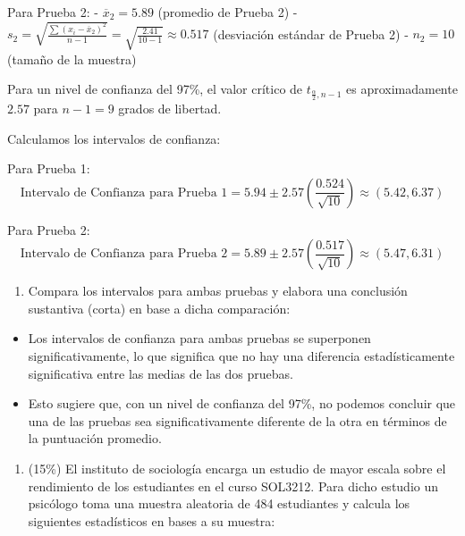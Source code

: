 \documentclass[
  letterpaper,
  DIV=11,
  numbers=noendperiod]{scrartcl}
\providecommand{\tightlist}{%
  \setlength{\itemsep}{0pt}\setlength{\parskip}{0pt}}\usepackage{longtable,booktabs,array}
\begin{document}
Para Prueba 2: - \(\overline{x}_2 = 5.89\) (promedio de Prueba 2) -
\(s_2 = \sqrt{\frac{\sum{(x_i - \overline{x}_2)^2}}{n-1}} = \sqrt{\frac{2.41}{10-1}} \approx 0.517\)
(desviación estándar de Prueba 2) - \(n_2 = 10\) (tamaño de la muestra)

Para un nivel de confianza del 97\%, el valor crítico de
\(t_{\frac{\alpha}{2}, n-1}\) es aproximadamente \(2.57\) para
\(n-1 = 9\) grados de libertad.

Calculamos los intervalos de confianza:

Para Prueba 1:
\[\text{Intervalo de Confianza para Prueba 1} = 5.94 \pm 2.57 \left(\frac{0.524}{\sqrt{10}}\right) \approx (5.42, 6.37)\]

Para Prueba 2:
\[\text{Intervalo de Confianza para Prueba 2} = 5.89 \pm 2.57 \left(\frac{0.517}{\sqrt{10}}\right) \approx (5.47, 6.31)\]

\begin{enumerate}
\def\labelenumi{\roman{enumi}.}
\setcounter{enumi}{1}
\tightlist
\item
  Compara los intervalos para ambas pruebas y elabora una conclusión
  sustantiva (corta) en base a dicha comparación:
\end{enumerate}

\begin{itemize}
\tightlist
\item
  Los intervalos de confianza para ambas pruebas se superponen
  significativamente, lo que significa que no hay una diferencia
  estadísticamente significativa entre las medias de las dos pruebas.
\item
  Esto sugiere que, con un nivel de confianza del 97\%, no podemos
  concluir que una de las pruebas sea significativamente diferente de la
  otra en términos de la puntuación promedio.
\end{itemize}

\begin{enumerate}
\def\labelenumi{\arabic{enumi}.}
\setcounter{enumi}{4}
\tightlist
\item
  (15\%) El instituto de sociología encarga un estudio de mayor escala
  sobre el rendimiento de los estudiantes en el curso SOL3212. Para
  dicho estudio un psicólogo toma una muestra aleatoria de 484
  estudiantes y calcula los siguientes estadísticos en bases a su
  muestra:
\end{enumerate}
\end{document}
